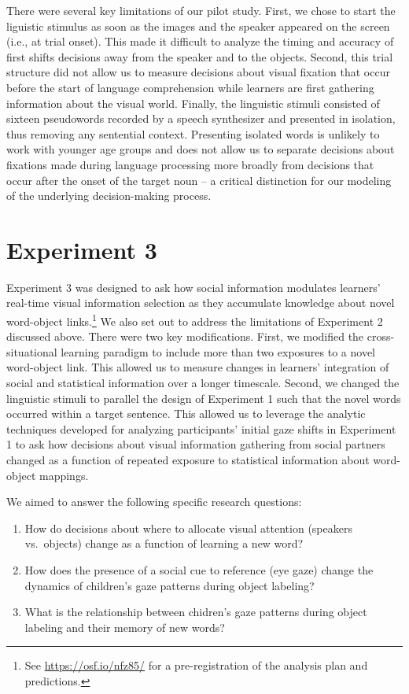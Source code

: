 \documentclass[man,floatsintext]{apa6}
\providecommand{\tightlist}{%
  \setlength{\itemsep}{0pt}\setlength{\parskip}{0pt}}
\let\rmarkdownfootnote\footnote%
\def\footnote{\protect\rmarkdownfootnote}
\theoremstyle{definition}
\theoremstyle{definition}
\theoremstyle{definition}
\theoremstyle{remark}
\begin{document}
There were several key limitations of our pilot study. First, we chose
to start the liguistic stimulus as soon as the images and the speaker
appeared on the screen (i.e., at trial onset). This made it difficult to
analyze the timing and accuracy of first shifts decisions away from the
speaker and to the objects. Second, this trial structure did not allow
us to measure decisions about visual fixation that occur before the
start of language comprehension while learners are first gathering
information about the visual world. Finally, the linguistic stimuli
consisted of sixteen pseudowords recorded by a speech synthesizer and
presented in isolation, thus removing any sentential context. Presenting
isolated words is unlikely to work with younger age groups and does not
allow us to separate decisions about fixations made during language
processing more broadly from decisions that occur after the onset of the
target noun -- a critical distinction for our modeling of the underlying
decision-making process.

\section{Experiment 3}\label{experiment-3}

Experiment 3 was designed to ask how social information modulates
learners' real-time visual information selection as they accumulate
knowledge about novel word-object links.\footnote{See
  \url{https://osf.io/nfz85/} for a pre-registration of the analysis
  plan and predictions.} We also set out to address the limitations of
Experiment 2 discussed above. There were two key modifications. First,
we modified the cross-situational learning paradigm to include more than
two exposures to a novel word-object link. This allowed us to measure
changes in learners' integration of social and statistical information
over a longer timescale. Second, we changed the linguistic stimuli to
parallel the design of Experiment 1 such that the novel words occurred
within a target sentence. This allowed us to leverage the analytic
techniques developed for analyzing participants' initial gaze shifts in
Experiment 1 to ask how decisions about visual information gathering
from social partners changed as a function of repeated exposure to
statistical information about word-object mappings.

\noindent
We aimed to answer the following specific research questions:

\begin{enumerate}
\def\labelenumi{\arabic{enumi}.}
\tightlist
\item
  How do decisions about where to allocate visual attention (speakers
  vs.~objects) change as a function of learning a new word?
\item
  How does the presence of a social cue to reference (eye gaze) change
  the dynamics of children's gaze patterns during object labeling?
\item
  What is the relationship between chidren's gaze patterns during object
  labeling and their memory of new words?
\end{enumerate}
\end{document}
